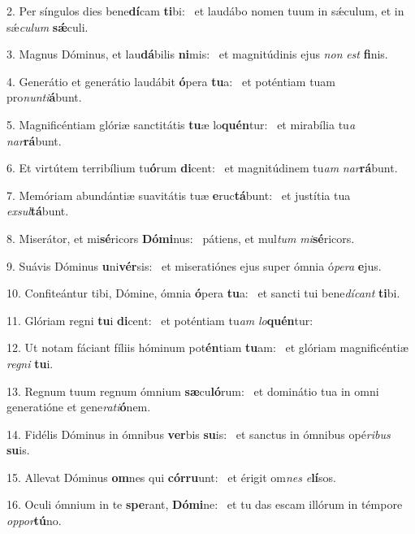 2. Per síngulos dies bene\textbf{dí}cam \textbf{ti}bi: \ast\  et laudábo nomen tuum in sǽculum, et in sǽ\textit{cu}\textit{lum} \textbf{sǽ}culi.\

3. Magnus Dóminus, et lau\textbf{dá}bilis \textbf{ni}mis: \ast\  et magnitúdinis ejus \textit{non} \textit{est} \textbf{fi}nis.\

4. Generátio et generátio laudábit \textbf{ó}pera \textbf{tu}a: \ast\  et poténtiam tuam pro\textit{nun}\textit{ti}\textbf{á}bunt.\

5. Magnificéntiam glóriæ sanctitátis \textbf{tu}æ lo\textbf{quén}tur: \ast\  et mirabília tu\textit{a} \textit{nar}\textbf{rá}bunt.\

6. Et virtútem terribílium tu\textbf{ó}rum \textbf{di}cent: \ast\  et magnitúdinem tu\textit{am} \textit{nar}\textbf{rá}bunt.\

7. Memóriam abundántiæ suavitátis tuæ \textbf{e}ruc\textbf{tá}bunt: \ast\  et justítia tua \textit{ex}\textit{sul}\textbf{tá}bunt.\

8. Miserátor, et mi\textbf{sé}ricors \textbf{Dó}\textbf{mi}nus: \ast\  pátiens, et mul\textit{tum} \textit{mi}\textbf{sé}ricors.\

9. Suávis Dóminus \textbf{u}ni\textbf{vér}sis: \ast\  et miseratiónes ejus super ómnia ó\textit{pe}\textit{ra} \textbf{e}jus.\

10. Confiteántur tibi, Dómine, ómnia \textbf{ó}pera \textbf{tu}a: \ast\  et sancti tui bene\textit{dí}\textit{cant} \textbf{ti}bi.\

11. Glóriam regni \textbf{tu}i \textbf{di}cent: \ast\  et poténtiam tu\textit{am} \textit{lo}\textbf{quén}tur:\

12. Ut notam fáciant fíliis hóminum pot\textbf{én}tiam \textbf{tu}am: \ast\  et glóriam magnificéntiæ \textit{re}\textit{gni} \textbf{tu}i.\

13. Regnum tuum regnum ómnium \textbf{sæ}cu\textbf{ló}rum: \ast\  et dominátio tua in omni generatióne et gene\textit{ra}\textit{ti}\textbf{ó}nem.\

14. Fidélis Dóminus in ómnibus \textbf{ver}bis \textbf{su}is: \ast\  et sanctus in ómnibus opé\textit{ri}\textit{bus} \textbf{su}is.\

15. Allevat Dóminus \textbf{om}nes qui \textbf{cór}\textbf{ru}unt: \ast\  et érigit om\textit{nes} \textit{e}\textbf{lí}sos.\

16. Oculi ómnium in te \textbf{spe}rant, \textbf{Dó}\textbf{mi}ne: \ast\  et tu das escam illórum in témpore \textit{op}\textit{por}\textbf{tú}no.\


